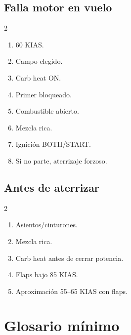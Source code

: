 \documentclass[11pt,oneside]{book}
\newenvironment{checklist}{\begin{enumerate}[label=\arabic*.]}{\end{enumerate}}
\begin{document}
\section*{Falla motor en vuelo}
\begin{multicols}{2}
\begin{checklist}
\item 60 KIAS.
\item Campo elegido.
\item Carb heat ON.
\item Primer bloqueado.
\item Combustible abierto.
\item Mezcla rica.
\item Ignición BOTH/START.
\item Si no parte, aterrizaje forzoso.
\end{checklist}
\end{multicols}

\section*{Antes de aterrizar}
\begin{multicols}{2}
\begin{checklist}
\item Asientos/cinturones.
\item Mezcla rica.
\item Carb heat antes de cerrar potencia.
\item Flaps bajo 85 KIAS.
\item Aproximación 55--65 KIAS con flaps.
\end{checklist}
\end{multicols}

\chapter{Glosario mínimo}
\end{document}
